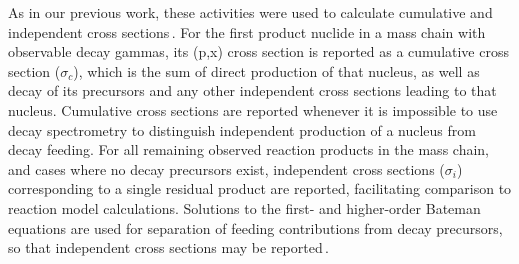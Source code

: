As in our previous work, these activities were used to calculate 
cumulative and independent cross sections\,\cite{Voyles2018a}.
For the first product nuclide in a mass chain with observable decay gammas, its (p,x) cross section is reported as a cumulative cross section ($\sigma_c$), which is the sum of direct production of that nucleus, as well as decay of its  precursors and any other independent cross sections leading to that nucleus. 
Cumulative cross sections are reported whenever it is impossible to use decay spectrometry to distinguish independent production of a nucleus from decay feeding.
For all remaining observed reaction products in the mass chain, and cases where no decay precursors exist, independent cross sections  ($\sigma_i$) corresponding to a single 
residual product are reported, 
facilitating comparison to reaction model calculations.  
Solutions to the first- and higher-order  Bateman equations are used for separation of  feeding contributions from decay precursors, so that  independent cross sections may be reported\,\cite{bateman1910solution,Cetnar2006}.







